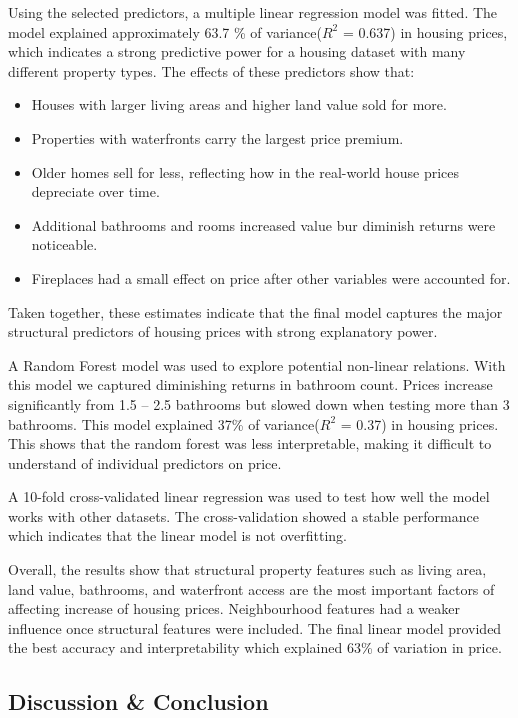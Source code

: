 \documentclass[letterpaper,9pt,twocolumn,twoside,]{pinp}
\providecommand{\tightlist}{%
  \setlength{\itemsep}{0pt}\setlength{\parskip}{0pt}}
\begin{document}
Using the selected predictors, a multiple linear regression model was
fitted. The model explained approximately 63.7 \% of variance(\(R^2\) =
0.637) in housing prices, which indicates a strong predictive power for
a housing dataset with many different property types. The effects of
these predictors show that:

\begin{itemize}
\tightlist
\item
  Houses with larger living areas and higher land value sold for more.
\item
  Properties with waterfronts carry the largest price premium.
\item
  Older homes sell for less, reflecting how in the real-world house
  prices depreciate over time.
\item
  Additional bathrooms and rooms increased value bur diminish returns
  were noticeable.
\item
  Fireplaces had a small effect on price after other variables were
  accounted for.
\end{itemize}

Taken together, these estimates indicate that the final model captures
the major structural predictors of housing prices with strong
explanatory power.

A Random Forest model was used to explore potential non-linear
relations. With this model we captured diminishing returns in bathroom
count. Prices increase significantly from 1.5 -- 2.5 bathrooms but
slowed down when testing more than 3 bathrooms. This model explained
37\% of variance(\(R^2\) = 0.37) in housing prices. This shows that the
random forest was less interpretable, making it difficult to understand
of individual predictors on price.

A 10-fold cross-validated linear regression was used to test how well
the model works with other datasets. The cross-validation showed a
stable performance which indicates that the linear model is not
overfitting.

Overall, the results show that structural property features such as
living area, land value, bathrooms, and waterfront access are the most
important factors of affecting increase of housing prices. Neighbourhood
features had a weaker influence once structural features were included.
The final linear model provided the best accuracy and interpretability
which explained 63\% of variation in price.

\subsection{Discussion \& Conclusion}\label{discussion-conclusion}
\end{document}
